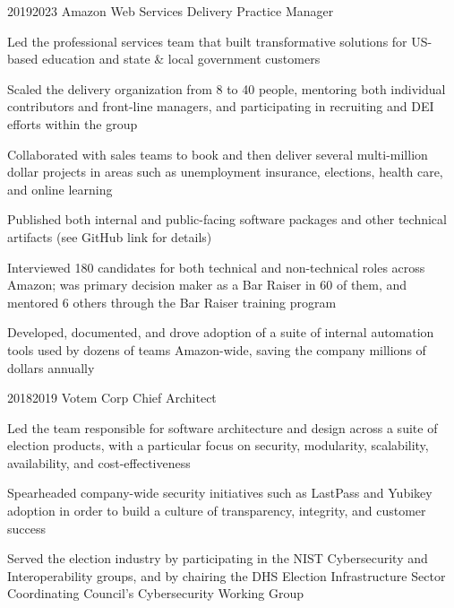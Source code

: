 \documentclass{article}
\begin{document}
\job
  {2019}{2023}
  {Amazon Web Services}
  {Delivery Practice Manager}
  {\begin{achievements}
    \item Led the professional services team that built transformative solutions for US-based education and state \& local government customers
    \item Scaled the delivery organization from 8 to 40 people, mentoring both individual contributors and front-line managers, and participating in recruiting and DEI efforts within the group
    \item Collaborated with sales teams to book and then deliver several multi-million dollar projects in areas such as unemployment insurance, elections, health care, and online learning
    \item Published both internal and public-facing software packages and other technical artifacts (see GitHub link for details)
    \item Interviewed 180 candidates for both technical and non-technical roles across Amazon; was primary decision maker as a Bar Raiser in 60 of them, and mentored 6 others through the Bar Raiser training program
    \item Developed, documented, and drove adoption of a suite of internal automation tools used by dozens of teams Amazon-wide, saving the company millions of dollars annually
  \end{achievements}}

\job
  {2018}{2019}
  {Votem Corp}
  {Chief Architect}
  {\begin{achievements}
    \item Led the team responsible for software architecture and design across a suite of election products, with a particular focus on security, modularity, scalability, availability, and cost-effectiveness
    \item Spearheaded company-wide security initiatives such as LastPass and Yubikey adoption in order to build a culture of transparency, integrity, and customer success
    \item Served the election industry by participating in the NIST Cybersecurity and Interoperability groups, and by chairing the DHS Election Infrastructure Sector Coordinating Council's Cybersecurity Working Group
  \end{achievements}}

\pagebreak
\end{document}

